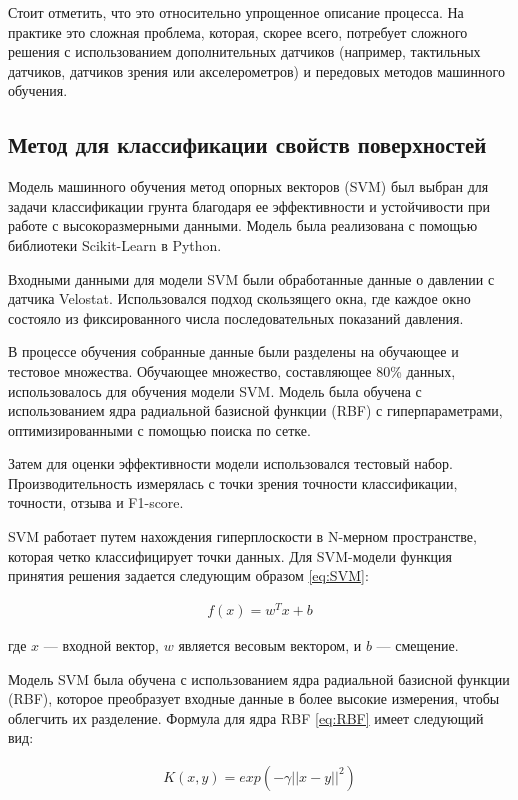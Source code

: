 Стоит отметить, что это относительно упрощенное описание процесса. На практике это сложная проблема, которая, скорее всего, потребует сложного решения с использованием дополнительных датчиков (например, тактильных датчиков, датчиков зрения или акселерометров) и передовых методов машинного обучения.

\subsection{Метод для классификации свойств поверхностей}

Модель машинного обучения метод опорных векторов (SVM) был выбран  для задачи классификации грунта благодаря ее эффективности и устойчивости при работе с высокоразмерными данными. Модель была реализована с помощью библиотеки Scikit-Learn в Python.

Входными данными для модели SVM были обработанные данные о давлении с датчика Velostat. Использовался подход скользящего окна, где каждое окно состояло из фиксированного числа последовательных показаний давления. 

В процессе обучения собранные данные были разделены на обучающее и тестовое множества. Обучающее множество, составляющее 80\% данных, использовалось для обучения модели SVM. Модель была обучена с использованием ядра радиальной базисной функции (RBF) с гиперпараметрами, оптимизированными с помощью поиска по сетке. 

Затем для оценки эффективности модели использовался тестовый набор. Производительность измерялась с точки зрения точности классификации, точности, отзыва и F1-score.

SVM работает путем нахождения гиперплоскости в N-мерном пространстве, которая четко классифицирует точки данных. Для SVM-модели функция принятия решения задается следующим образом \eqref{eq:SVM}:

\begin{align}
    \label{eq:SVM}
    f(x) = w^T x + b
\end{align}

где $x$ --- входной вектор, $w$ является весовым вектором, и $b$ --- смещение.


Модель SVM была обучена с использованием ядра радиальной базисной функции (RBF), которое преобразует входные данные в более высокие измерения, чтобы облегчить их разделение. Формула для ядра RBF \eqref{eq:RBF} имеет следующий вид:

\begin{align}
    \label{eq:RBF}
    K(x, y) = exp(-\gamma ||x - y||^2)
\end{align}

